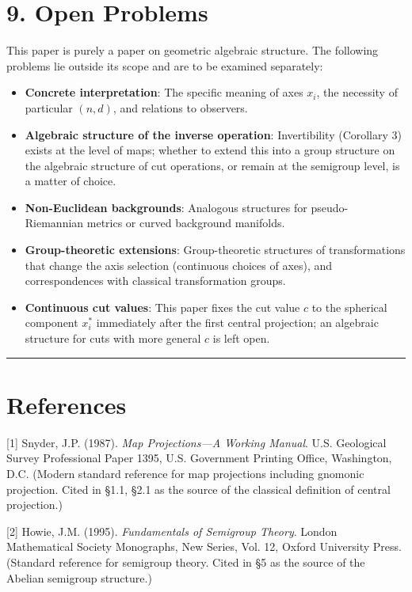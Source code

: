 \documentclass[a4paper,11pt]{article}
\theoremstyle{definition}
\theoremstyle{remark}
\providecommand{\tightlist}{%
  \setlength{\itemsep}{0pt}\setlength{\parskip}{0pt}}
\begin{document}
\section{9. Open Problems}\label{open-problems}

This paper is purely a paper on geometric algebraic structure. The
following problems lie outside its scope and are to be examined
separately:

\begin{itemize}
\tightlist
\item
  \textbf{Concrete interpretation}: The specific meaning of axes
  \(x_i\), the necessity of particular \((n, d)\), and relations to
  observers.
\item
  \textbf{Algebraic structure of the inverse operation}: Invertibility
  (Corollary 3) exists at the level of maps; whether to extend this into
  a group structure on the algebraic structure of cut operations, or
  remain at the semigroup level, is a matter of choice.
\item
  \textbf{Non-Euclidean backgrounds}: Analogous structures for
  pseudo-Riemannian metrics or curved background manifolds.
\item
  \textbf{Group-theoretic extensions}: Group-theoretic structures of
  transformations that change the axis selection (continuous choices of
  axes), and correspondences with classical transformation groups.
\item
  \textbf{Continuous cut values}: This paper fixes the cut value \(c\)
  to the spherical component \(x_i^{*}\) immediately after the first
  central projection; an algebraic structure for cuts with more general
  \(c\) is left open.
\end{itemize}

\begin{center}\rule{0.5\linewidth}{0.5pt}\end{center}

\section{References}\label{references}

{[}1{]} Snyder, J.P. (1987). \emph{Map Projections---A Working Manual}.
U.S. Geological Survey Professional Paper 1395, U.S. Government Printing
Office, Washington, D.C. (Modern standard reference for map projections
including gnomonic projection. Cited in §1.1, §2.1 as the source of the
classical definition of central projection.)

{[}2{]} Howie, J.M. (1995). \emph{Fundamentals of Semigroup Theory}.
London Mathematical Society Monographs, New Series, Vol. 12, Oxford
University Press. (Standard reference for semigroup theory. Cited in §5
as the source of the Abelian semigroup structure.)
\end{document}
